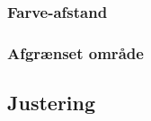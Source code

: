 \subsubsection{Farve-afstand}

\subsubsection{Afgrænset område}

\subsection{Justering}\label{tracking:adjust}
